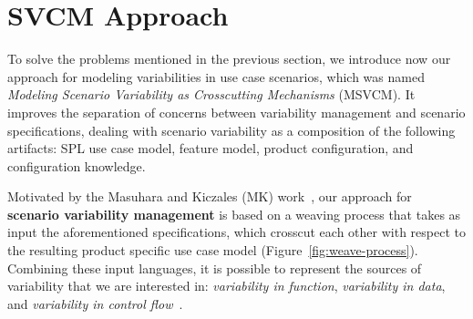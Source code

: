 \documentclass{acm_proc_article-sp}
\begin{document}
%


\section{SVCM Approach}
\label{sec:svmc}

To solve the problems mentioned in the previous section, we introduce now our
approach for modeling variabilities in use case scenarios, which was named
\emph{Modeling Scenario Variability as Crosscutting Mechanisms} (MSVCM). It
improves the separation of concerns between variability management and scenario
specifications, dealing with scenario variability as a composition of the
following artifacts: SPL use case model, feature model, product configuration,
and configuration knowledge.

Motivated by the Masuhara and Kiczales (MK) work~\cite{Masuhara:2003aa}, our
approach for \textbf{scenario variability management} is based on a weaving
process that takes as input the aforementioned specifications, which crosscut
each other with respect to the resulting product specific use case model
(Figure~\ref{fig:weave-process}). Combining these input languages, it is possible
to represent the sources of variability that we are interested in:
\emph{variability in function}, \emph{variability in data}, and \emph{variability in
control flow}~\cite{Bachmann:2001aa}.
\end{document}

